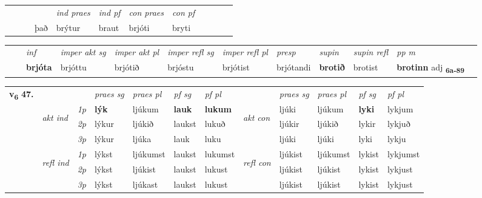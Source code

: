 \begin{tabular}{llllllllllll}
 & &  & &  \textit{ind praes} & \textit{ind pf} & \textit{con praes} & \textit{con pf} \\*
&  & & það & brýtur & braut & brjóti & bryti \\*
\cmidrule{5-9}
\end{tabular}


\begin{tabular}{llllllllllll}
 & & \textit{inf} & \textit{imper akt sg} & \textit{imper akt pl} & \textit{imper refl sg} & \textit{imper refl pl} & \textit{presp} & \textit{supin} & \textit{supin refl} & \textit{pp m}     \\*
  & & \textbf{brjóta} & brjóttu  & brjótið & brjóstu & brjótist & brjótandi &  \textbf{brotið} & brotist & \textbf{brotinn} adj \textbf{\textsubscript{6a-89}} \\*
\cmidrule{1-12}
\end{tabular}



\begin{tabular}{llllllllllll} \toprule
\multirow{4}{*}{{{\textbf{v{\textsubscript{6}}} \Large{\textbf{47.}}}}}  & &   &  \textit{praes sg}  & \textit{praes pl}  &\textit{ pf sg} & \textit{pf pl} &  &  \textit{praes sg}  & \textit{praes pl}  & \textit{pf sg} & \textit{pf pl } \\*
	\cmidrule{4-7} \cmidrule{9-12}
 & \multirow{3}{*}{\begin{turn}{90}\textit{akt ind}\end{turn}} & {\textit{1p}} & \textbf{lýk} & ljúkum    & \textbf{lauk} & \textbf{lukum} & \multirow{3}{*}{\begin{turn}{90}\textit{akt con}\end{turn}} &ljúki & ljúkum & \textbf{lyki} & lykjum\\*
& &  {\textit{2p}} &  lýkur  & ljúkið   & laukst & lukuð & & ljúkir & ljúkið & lykir & lykjuð \\*
& &  {\textit{3p}} & lýkur & ljúka   & lauk & luku & & ljúki & ljúki& lyki & lykju  \\*
\cmidrule{4-7} \cmidrule{9-12}
 &\multirow{3}{*}{\begin{turn}{90}\textit{refl ind}\end{turn}} & {\textit{1p}} & lýkst & ljúkumst    & laukst & lukumst & \multirow{3}{*}{\begin{turn}{90}\textit{refl con}\end{turn}}  &ljúkist & ljúkumst & lykist & lykjumst\\*
 &&  {\textit{2p}} &  lýkst  & ljúkist   & laukst & lukust & &ljúkist & ljúkist & lykist & lykjust \\*
& &  {\textit{3p}} & lýkst & ljúkast   & laukst & lukust & & ljúkist & ljúkist& lykist & lykjust  \\*
\cmidrule{4-7} \cmidrule{9-12}
\end{tabular}


